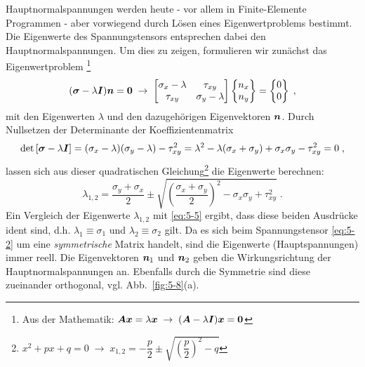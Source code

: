 Hauptnormalspannungen werden heute - vor allem in Finite-Elemente Programmen - aber vorwiegend durch Lösen eines Eigenwertproblems bestimmt.
Die Eigenwerte des Spannungstensors entsprechen dabei den Hauptnormalspannungen.
Um dies zu zeigen, formulieren wir zunächst das Eigenwertproblem%
\footnote{Aus der Mathematik: $\boldsymbol{Ax}=\lambda\boldsymbol{x}\;\rightarrow\;(\boldsymbol{A}-\lambda\boldsymbol{I})\boldsymbol{x}=\boldsymbol{0}$}
%
\begin{equation}
(\boldsymbol{\sigma}-\lambda\boldsymbol{I})\boldsymbol{n}=\boldsymbol{0} \;\rightarrow\;
\begin{bmatrix}
\sigma_x-\lambda & \tau_{xy} \\ \tau_{xy} & \sigma_y-\lambda
\end{bmatrix}
\begin{Bmatrix}n_x \\ n_y\end{Bmatrix} = 
\begin{Bmatrix}0 \\ 0\end{Bmatrix} \; ,
\label{eq:5-9}
\end{equation}
%
mit den Eigenwerten $\lambda$ und den dazugehörigen Eigenvektoren $\boldsymbol{n}$.
Durch Nullsetzen der Determinante der Koeffizientenmatrix 
%
\begin{equation}
\det\left[\boldsymbol{\sigma}-\lambda\boldsymbol{I}\right] = (\sigma_x-\lambda)(\sigma_y-\lambda)-\tau_{xy}^2 =\lambda^2-\lambda(\sigma_x+\sigma_y) + \sigma_x\sigma_y - \tau_{xy}^2= 0 \; ,
\label{eq:5-10}
\end{equation}
%
lassen sich aus dieser quadratischen Gleichung\footnote{$x^2+px+q=0\;\rightarrow\;x_{1,2}=-\dfrac{p}{2}\pm\sqrt{\left(\dfrac{p}{2}\right)^2-q}$} die Eigenwerte berechnen:
%
\begin{equation}
\lambda_{1,2} = \dfrac{\sigma_y+\sigma_x}{2}\pm\sqrt{\left(\dfrac{\sigma_x+\sigma_y}{2}\right)^2-\sigma_x\sigma_y+\tau_{xy}^2} \; .
\label{eq:5-11}
\end{equation}
%
Ein Vergleich der Eigenwerte $\lambda_{1,2}$ mit \eqref{eq:5-5} ergibt, dass diese beiden Ausdrücke ident sind, d.h. $\lambda_1\equiv\sigma_1$ und $\lambda_2\equiv\sigma_2$ gilt.
Da es sich beim Spannungstensor \eqref{eq:5-2} um eine \emph{symmetrische} Matrix handelt, sind die Eigenwerte (Hauptspannungen) immer reell.
Die Eigenvektoren $\boldsymbol{n}_1$ und $\boldsymbol{n}_2$ geben die Wirkungsrichtung der Hauptnormalspannungen an.
Ebenfalls durch die Symmetrie sind diese zueinander orthogonal, vgl. Abb.~\ref{fig:5-8}(a).

\FloatBarrier


